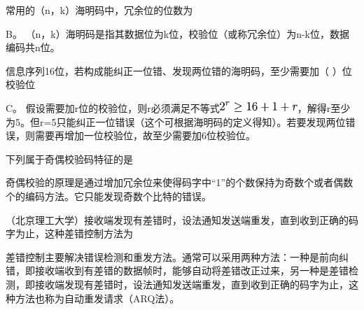 \question 常用的（n，k）海明码中，冗余位的位数为
\par{}
\begin{solution}B。
（n，k）海明码是指其数据位为k位，校验位（或称冗余位）为n-k位，数据编码共n位。
\end{solution}
\question 信息序列16位，若构成能纠正一位错、发现两位错的海明码，至少需要加（
）位校验位
\par{}
\begin{solution}C。
假设需要加r位的校验位，则r必须满足不等式\includegraphics[width=1.15625in,height=0.15625in]{texmath/64146f5Cdpi7B3507D7B25Er7D5Cge162B12Br}，解得r至少为5。但r=5只能纠正一位错误（这个可根据海明码的定义得知）。若要发现两位错误，则需要再增加一位校验位，故至少需要加6位校验位。
\end{solution}
\question 下列属于奇偶校验码特征的是
\par{}
\begin{solution}奇偶校验的原理是通过增加冗余位来使得码字中``1''的个数保持为奇数个或者偶数个的编码方法。它只能发现奇数个比特的错误。
\end{solution}
\question （北京理工大学）接收端发现有差错时，设法通知发送端重发，直到收到正确的码字为止，这种差错控制方法为
\par{}
\begin{solution}差错控制主要解决错误检测和重发方法。通常可以采用两种方法：一种是前向纠错，即接收端收到有差错的数据帧时，能够自动将差错改正过来，另一种是差错检测，即接收端发现有差错时，设法通知发送端重发，直到收到正确的码字为止，这种方法也称为自动重发请求（ARQ法）。
\end{solution}
